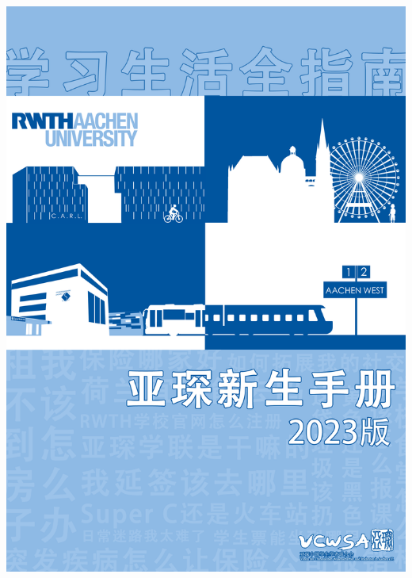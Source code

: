 \documentclass[a4paper,10pt,oneside]{scrbook}
\begin{document}
\frontmatter

\begin{titlepage}
\parindent=0pt
\includegraphics[width=\linewidth]{Bilder/FrontCover.png}
\end{titlepage}



\tableofcontents

\mainmatter








\end{document}
